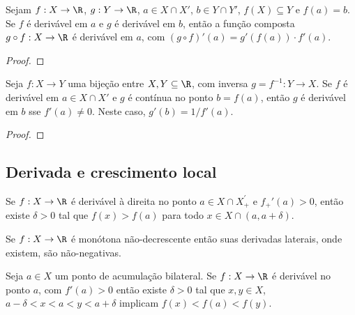\documentclass{article}
\begin{document}
\begin{thm} 
    Sejam \(f: X \to \R\), \(g: Y \to \R\), \(a \in X \cap X'\), \(b \in Y \cap Y'\), \(f(X) \subseteq Y\) e \(f(a) = b\). Se \(f\) é derivável em \(a\) e \(g\) é derivável em \(b\), então a função composta \(g \circ f: X \to \R\) é derivável em \(a\), com \((g \circ f)'(a) = g'(f(a)) \cdot f'(a)\).
\end{thm}

\begin{proof}
    
\end{proof}

\begin{cor}
    Seja \(f: X \to Y\) uma bijeção entre \(X, Y \subseteq \R\), com inversa \(g = f^{-1}: Y \to X\). Se \(f\) é derivável em \(a \in X \cap X'\) e \(g\) é contínua no ponto \(b = f(a)\), então \(g\) é derivável em \(b\) sse \(f'(a) \neq 0\). Neste caso, \(g'(b) = 1 / f'(a)\).
\end{cor}

\begin{proof}
    
\end{proof}

\subsection{Derivada e crescimento local}

\begin{prop} \label{prop:crescimento_local}
    Se \(f: X \to \R\) é derivável à direita no ponto \(a \in X \cap X_{+}^{'}\) e \(f_{+}'(a) > 0\), então existe \(\delta > 0\) tal que \(f(x) > f(a)\) para todo \(x \in X \cap (a, a + \delta)\).
\end{prop}

\begin{cor} \label{cor:monotonicidade_derivada}
    Se \(f: X \to \R\) é monótona não-decrescente então suas derivadas laterais, onde existem, são não-negativas.
\end{cor}

\begin{cor} \label{cor:crescimento_local}
    Seja \(a \in X\) um ponto de acumulação bilateral. Se \(f: X \to \R\) é derivável no ponto \(a\), com \(f'(a) > 0\) então existe \(\delta > 0\) tal que \(x, y \in X\), \(a-\delta < x < a < y < a+\delta\) implicam \(f(x) < f(a) < f(y)\).
\end{cor}
\end{document}
